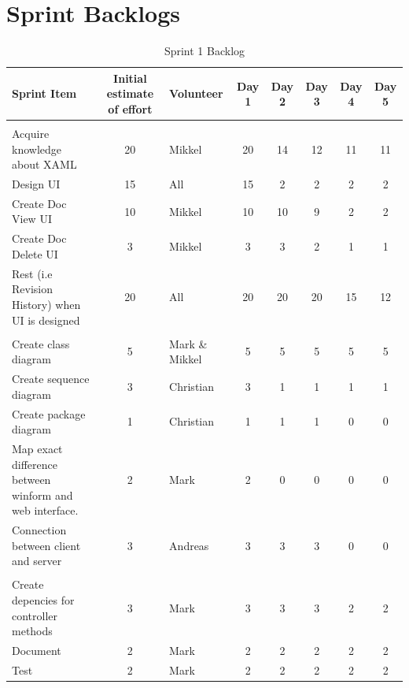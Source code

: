 \documentclass[a4paper,11pt,report]{report}
\begin{document}
\section{Sprint Backlogs}
\begin{landscape}
				\begin{table}[htbp]
 				\centering
				\caption{Sprint 1 Backlog}
				\begin{tabular}{l c l c c c c c}
				\hline \hline
				\textbf{Sprint Item} & \textbf{Initial estimate of effort} & \textbf{Volunteer} & \textbf{Day 1} & \textbf{Day 2} & \textbf{Day 3} & \textbf{Day 4} & \textbf				{Day 5} \\
				\hline
			         &       &       &       &       &       &       &  \\
				Acquire knowledge about XAML & 20    & Mikkel & 20    & 14    & 12    & 11    & 11 \\
				Design UI & 15    & All   & 15    & 2     & 2     & 2     & 2 \\
				Create Doc View UI & 10    & Mikkel & 10    & 10    & 9     & 2     & 2 \\
				Create Doc Delete UI & 3     & Mikkel & 3     & 3     & 2     & 1     & 1 \\
				Rest (i.e Revision History) when UI is designed & 20    & All   & 20    & 20    & 20    & 15    & 12 \\
				&       &       &       &       &       &       &  \\
				Create class diagram & 5     & Mark \& Mikkel & 5     & 5     & 5     & 5     & 5 \\
			 	Create sequence diagram & 3     & Christian & 3     & 1     & 1     & 1     & 1 \\
				Create package diagram & 1     & Christian & 1     & 1     & 1     & 0     & 0 \\
				Map exact difference between winform and web interface. & 2     & Mark  & 2     & 0     & 0     & 0     & 0 \\
				Connection between client and server & 3     & Andreas & 3     & 3     & 3     & 0     & 0 \\
				&       &       &       &       &       &       &  \\
				Create depencies for controller methods & 3     & Mark  & 3     & 3     & 3     & 2     & 2 \\
				Document & 2     & Mark  & 2     & 2     & 2     & 2     & 2 \\
				Test  & 2     & Mark  & 2     & 2     & 2     & 2     & 2 \\

\end{tabular}
\end{table}
\end{landscape}
\end{document}
